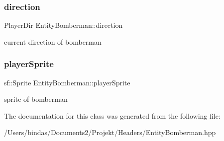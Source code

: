 \subsubsection{\texorpdfstring{direction}{direction}}
{\footnotesize\ttfamily Player\+Dir Entity\+Bomberman\+::direction\hspace{0.3cm}{\ttfamily [private]}}

current direction of bomberman \mbox{\label{class_entity_bomberman_aeb4c8553024331c7d4d25f387c856b1d}} 
\subsubsection{\texorpdfstring{playerSprite}{playerSprite}}
{\footnotesize\ttfamily sf\+::\+Sprite Entity\+Bomberman\+::player\+Sprite\hspace{0.3cm}{\ttfamily [private]}}

sprite of bomberman 

The documentation for this class was generated from the following file\+:\begin{DoxyCompactItemize}
\item 
/\+Users/bindas/\+Documents2/\+Projekt/\+Headers/Entity\+Bomberman.\+hpp\end{DoxyCompactItemize}
